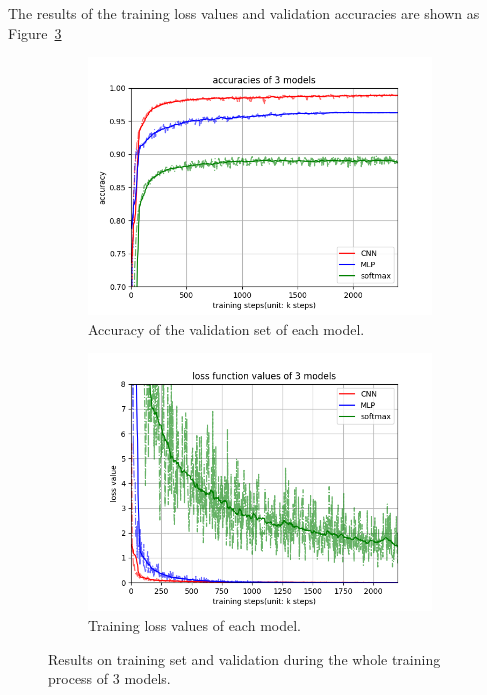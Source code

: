 \documentclass[12pt,letterpaper]{article}
\begin{document}
The results of the training loss values and validation accuracies are shown as Figure~\ref{fig:all_models}
\begin{figure}[h]
\centering
\begin{subfigure}{.49\textwidth}
  \centering
  \includegraphics[width=.95\linewidth]{allmodels_acc.png}
  \caption{\small Accuracy of the validation set of each model.}
  \label{fig:sub1}
\end{subfigure}%
\begin{subfigure}{.49\textwidth}
  \centering
  \includegraphics[width=.95\linewidth]{allmodels_loss.png}
  \caption{\small Training loss values of each model.}
  \label{fig:sub2}
\end{subfigure}
\caption{\small Results on training set and validation during the whole training process of $3$ models.}
\label{fig:all_models}
\end{figure}
\end{document}
